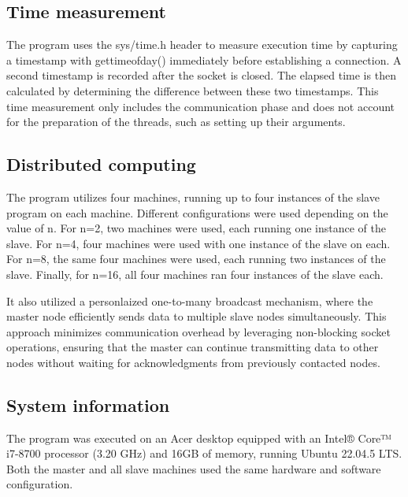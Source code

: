 \documentclass[journal]{./IEEE/IEEEtran}
\begin{document}
\subsection{Time measurement}
The program uses the sys/time.h header to measure execution time by capturing a timestamp with gettimeofday() immediately before establishing a connection. A second timestamp is recorded after the socket is closed. The elapsed time is then calculated by determining the difference between these two timestamps. This time measurement only includes the communication phase and does not account for the preparation of the threads, such as setting up their arguments.


\subsection{Distributed computing}
The program utilizes four machines, running up to four instances of the slave program on each machine. Different configurations were used depending on the value of n. For n=2, two machines were used, each running one instance of the slave. For n=4, four machines were used with one instance of the slave on each. For n=8, the same four machines were used, each running two instances of the slave. Finally, for n=16, all four machines ran four instances of the slave each.

It also utilized a personlaized one-to-many broadcast mechanism, where the master node efficiently sends data to multiple slave nodes simultaneously. This approach minimizes communication overhead by leveraging non-blocking socket operations, ensuring that the master can continue transmitting data to other nodes without waiting for acknowledgments from previously contacted nodes.





\subsection{System information}
The program was executed on an Acer desktop equipped with an Intel® Core™ i7-8700 processor (3.20 GHz) and 16GB of memory, running Ubuntu 22.04.5 LTS. Both the master and all slave machines used the same hardware and software configuration.
\end{document}
